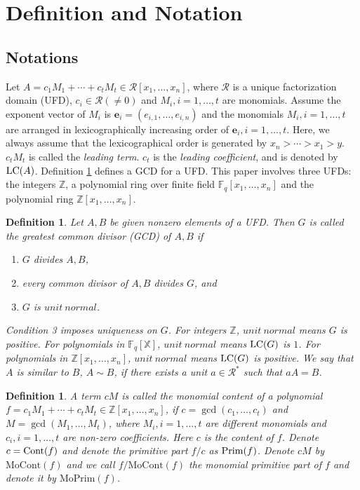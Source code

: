 \documentclass[final,20pt]{elsarticle}
\newtheorem{definition}[theorem]{Definition}
\def\Z{{\mathbb Z}}
\def\X{{\mathbb{X}}}
\def\F{{\mathbb{F}}}
\def\LC{\hbox{\rm{LC}}}
\def\Cont{\hbox{\rm{Cont}}}
\def\Prim{\hbox{\rm{Prim}}}
\begin{document}

\section{Definition and Notation}
\subsection{Notations}
Let $A=c_1M_1+\cdots+c_tM_t\in\mathcal{R}[x_1,\dots,x_n]$, where $\mathcal{R} $ is a unique factorization domain (UFD), $c_i\in\mathcal{R}(\neq 0)$ and $M_i,i=1,\dots,t$ are monomials. Assume the exponent vector of $M_i$ is $\mathbf{e}_i=(e_{i,1},\dots,e_{i,n})$ and the monomials $M_i,i=1,\dots,t$ are arranged in lexicographically increasing order of $\mathbf{e}_i,i=1,\dots,t$. Here, we always assume that the lexicographical order is generated by $x_n>\cdots >x_1>y$. $c_tM_t$ is called the {\em leading term}. $c_t$ is the {\em leading coefficient}, and is denoted by $\LC(A)$.
%
Definition \ref{def-0} defines a GCD for a UFD.  This paper involves three UFDs: the integers $\Z$, a polynomial ring over finite field $\F_q[x_1,\dots,x_n]$ and the polynomial ring $\Z[x_1,\dots,x_n]$.

\begin{definition} \label{def-0}
Let $A,B$ be given nonzero elements of a UFD. Then $G$ is called the greatest common divisor (GCD) of $A,B$ if
\begin{enumerate}
\item $G$ divides $A,B$,
\item every common divisor of $A,B$ divides $G$, and
\item $G$ is $unit\ normal$.
\end{enumerate}
Condition 3 imposes uniqueness on $G$.
%
For integers $\Z$, $unit\ normal$ means $G$ is positive.
%
For polynomials in $\F_q[\X]$, $unit\ normal$ means  $\LC(G)$ is $1$.
%
For polynomials in $\Z[x_1,\dots,x_n]$, $unit\ normal$ means $\LC(G)$ is positive.
%
We say that $A$ is similar to $B$, $A\sim B$, if there exists a unit $a\in \mathcal{R}^*$ such that $a A=B$.
\end{definition}

\begin{definition}\label{def-3}
A term $cM$ is called the {\em monomial content} of a polynomial $f=c_1M_1+\cdots+c_tM_t\in \Z[x_1,\dots,x_n]$, if
 $c=\gcd(c_1,\dots,c_t)$ and $M=\gcd(M_1,\dots,M_t)$, where $M_i,i=1,\dots,t$ are different monomials and $c_i,i=1,\dots,t$ are non-zero coefficients.
%
Here $c$ is the content of $f$. Denote $c=\Cont(f)$ and denote the primitive part $f/c$ as $\Prim(f)$.
Denote $cM$ by $\mathrm{MoCont}(f)$ and we call $f/\mathrm{MoCont}(f)$ the {\em monomial primitive part} of $f$ and denote it by $\mathrm{MoPrim}(f)$.
\end{definition}
\end{document}
